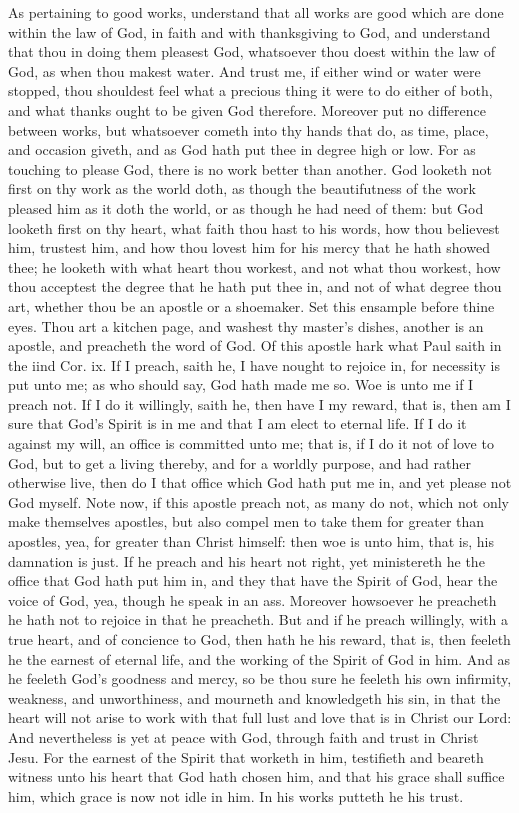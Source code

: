 As pertaining to good works, understand that all works 
are good which are done within the law of God, in faith 
and with thanksgiving to God, and understand that thou in 
doing them pleasest God, whatsoever thou doest within the 
law of God, as when thou makest water. And trust me, if 
either wind or water were stopped, thou shouldest feel what 
a precious thing it were to do either of both, and what 
thanks ought to be given God therefore. Moreover put 
no difference between works, but whatsoever cometh into 
thy hands that do, as time, place, and occasion giveth, and 
as God hath put thee in degree high or low. For as 
touching to please God, there is no work better than 
another. God looketh not first on thy work as the world 
doth, as though the beautifutness of the work pleased him 
as it doth the world, or as though he had need of them: 
but God looketh first on thy heart, what faith thou hast to 
his words, how thou believest him, trustest him, and how 
thou lovest him for his mercy that he hath showed thee; he 
looketh with what heart thou workest, and not what thou 
workest, how thou acceptest the degree that he hath put 
thee in, and not of what degree thou art, whether thou be an 
apostle or a shoemaker. Set this ensample before thine eyes. 
Thou art a kitchen page, and washest thy master's dishes, 
another is an apostle, and preacheth the word of God. Of 
this apostle hark what Paul saith in the iind Cor. ix. If 
I preach, saith he, I have nought to rejoice in, for necessity 
is put unto me; as who should say, God hath made me so. 
Woe is unto me if I preach not. If I do it willingly, saith 
he, then have I my reward, that is, then am I sure that 
God's Spirit is in me and that I am elect to eternal life. 
If I do it against my will, an office is committed unto me; 
that is, if I do it not of love to God, but to get a living 
thereby, and for a worldly purpose, and had rather otherwise
live, then do I that office which God hath put me in, 
and yet please not God myself. Note now, if this apostle 
preach not, as many do not, which not only make themselves
apostles, but also compel men to take them for greater 
than apostles, yea, for greater than Christ himself: then 
woe is unto him, that is, his damnation is just. If he preach 
and his heart not right, yet ministereth he the office that God 
hath put him in, and they that have the Spirit of God, hear 
the voice of God, yea, though he speak in an ass. Moreover
howsoever he preacheth he hath not to rejoice in that 
he preacheth. But and if he preach willingly, with a true 
heart, and of concience to God, then hath he his reward, 
that is, then feeleth he the earnest of eternal life, and the 
working of the Spirit of God in him. And as he feeleth 
God's goodness and mercy, so be thou sure he feeleth his 
own infirmity, weakness, and unworthiness, and mourneth 
and knowledgeth his sin, in that the heart will not arise to 
work with that full lust and love that is in Christ our 
Lord: And nevertheless is yet at peace with God, through 
faith and trust in Christ Jesu. For the earnest of the Spirit
that worketh in him, testifieth and beareth witness unto 
his heart that God hath chosen him, and that his grace shall 
suffice him, which grace is now not idle in him. In his 
works putteth he his trust. 

